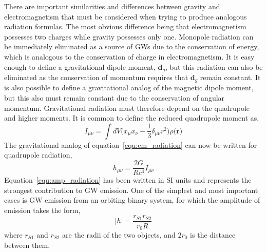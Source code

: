 There are important similarities and differences between gravity and electromagnetism that must be considered when trying to produce analogous radiation formulas. The most obvious difference being that electromagnetism possesses two charges while gravity possesses only one. Monopole radiation can be immediately eliminated as a source of GWs due to the conservation of energy, which is analogous to the conservation of charge in electromagnetism. It is easy enough to define a gravitational dipole moment, $\mathbf{d}_{g}$, but this radiation can also be eliminated as the conservation of momentum requires that $\dot{\mathbf{d}}_{g}$ remain constant. It is also possible to define a gravitational analog of the magnetic dipole moment, but this also must remain constant due to the conservation of angular momentum. Gravitational radiation must therefore depend on the quadrupole and higher moments. It is common to define the reduced quadrupole moment as,
\begin{equation}
    I_{\mu\nu} = \int dV\big(x_{\mu}x_{\nu} - \frac{1}{3}\delta_{\mu\nu}r^{2}\big)\rho\big(\mathbf{r}\big)
\end{equation}
The gravitational analog of equation~\ref{equ:em_radiation} can now be written for quadrupole radiation,
\begin{equation}
\label{equ:amp_radiation}
    h_{\mu\nu} = \frac{2G}{Rc^{4}} \ddot{I}_{\mu\nu}
\end{equation}
Equation~\ref{equ:amp_radiation} has been written in SI units and represents the strongest contribution to GW emission. One of the simplest and most important cases is GW emission from an orbiting binary system, for which the amplitude of emission takes the form,
\begin{equation}
    |h| = \frac{r_{S1}r_{S2}}{r_{0}R}
\end{equation}
where $r_{S1}$ and $r_{S2}$ are the radii of the two objects, and $2r_{0}$ is the distance between them.


